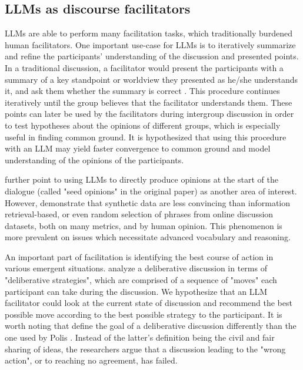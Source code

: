 \subsection{LLMs as discourse facilitators}
\label{sec:related:discource}


LLMs are able to perform many facilitation tasks, which traditionally burdened human facilitators. One important use-case for LLMs is to iteratively summarize and refine the participants' understanding of the discussion and presented points. In a traditional discussion, a facilitator would present the participants with a summary of a key standpoint or worldview they presented as he/she understands it, and ask them whether the summary is correct \cite{small-polis-llm, Tsai2024Generative}. This procedure continues iteratively until the group believes that the facilitator understands them. These points can later be used by the facilitators during intergroup discussion in order to test hypotheses about the opinions of different groups, which is especially useful in finding common ground. It is hypothesized \cite{small-polis-llm} that using this procedure with an LLM may yield faster convergence to common ground and model understanding of the opinions of the participants.

\citet{small-polis-llm} further point to using LLMs to directly produce opinions at the start of the dialogue (called "seed opinions" in the original paper) as another area of interest. However, \citet{karadzhov2023delidata} demonstrate that synthetic data are less convincing than information retrieval-based, or even random selection of phrases from online discussion datasets, both on many metrics, and by human opinion. This phenomenon is more prevalent on issues which necessitate advanced vocabulary and reasoning.

An important part of facilitation is identifying the best course of action in various emergent situations. \citet{al-khatib-etal-2018-modeling} analyze a deliberative discussion in terms of "deliberative strategies", which are comprised of a sequence of "moves" each participant can take during the discussion. We hypothesize that an LLM facilitator could look at the current state of discussion and recommend the best possible move according to the best possible strategy to the participant. It is worth noting that \citet{al-khatib-etal-2018-modeling} define the goal of a deliberative discussion differently than the one used by Polis \cite{small-polis-llm}. Instead of the latter's definition being the civil and fair sharing of ideas, the researchers argue that a discussion leading to the "wrong action", or to reaching no agreement, has failed.

